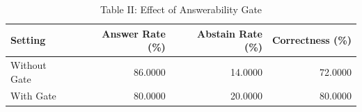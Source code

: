 \begin{table}
\caption{Table II: Effect of Answerability Gate}
\label{tab:answerability_gate}
\begin{tabular}{lrrr}
\toprule
Setting & Answer Rate (\%) & Abstain Rate (\%) & Correctness (\%) \\
\midrule
Without Gate & 86.0000 & 14.0000 & 72.0000 \\
With Gate & 80.0000 & 20.0000 & 80.0000 \\
\bottomrule
\end{tabular}
\end{table}
